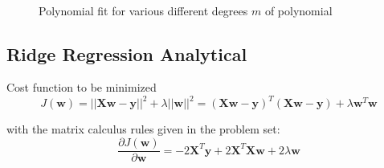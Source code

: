 \documentclass[12pt,a4paper]{scrartcl}
\newcommand{\matr}[1]{\mathbf{#1}}
\begin{document}
\begin{figure}[H]
		\\
		\caption{Polynomial fit for various different degrees $m$ of polynomial}
		\label{fig:ex1_1_poly_degrees}
	\end{figure}
	
	\subsection*{Ridge Regression Analytical}
	Cost function to be minimized
	\begin{equation}
		J(\matr{w}) = ||\matr{X}\matr{w}-\matr{y}||^2+\lambda ||\matr{w}||^2 = (\matr{X}\matr{w}-\matr{y})^T(\matr{X}\matr{w}-\matr{y})+\lambda\matr{w}^T\matr{w}
	\end{equation}
	
	with the matrix calculus rules given in the problem set:
	\begin{equation}
		\frac{\partial J\left( \matr{w}\right)}{\partial \matr{w}} = -2\matr{X}^T\matr{y}+2\matr{X}^T\matr{X}\matr{w}+2\lambda\matr{w}
	\end{equation}
\end{document}
